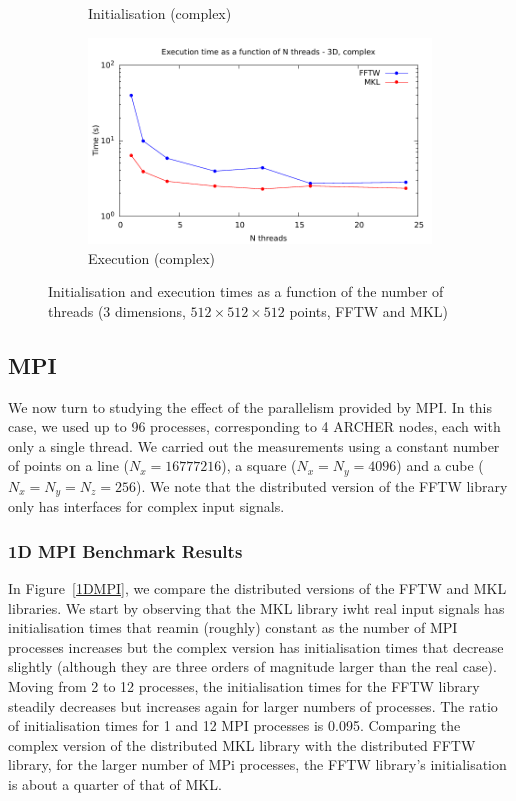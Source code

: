 \documentclass[12pt, a4paper]{article} \setlength{\textheight}{24cm}
\begin{document}
\begin{figure}[H]
\begin{subfigure}{.5\textwidth}
    \caption{Initialisation (complex)}
    \label{3DMULTHCI}
  \end{subfigure}%
  \begin{subfigure}{.5\textwidth}
    \centering
    \includegraphics[width=.9\linewidth]{graphs/3d-multh-exec-c.pdf}
    \caption{Execution (complex)}
    \label{3DMULTHCR}
  \end{subfigure}
  \caption{Initialisation and execution times as a function of the
    number of threads (3 dimensions, $512 \times 512\times 512$
    points, FFTW and MKL)}
  \label{3DMTHREAD}
\end{figure}

\subsection{MPI}\label{MPI}
We now turn to studying the effect of the parallelism provided by MPI.
In this case, we used up to 96 processes, corresponding to 4 ARCHER
nodes, each with only a single thread. We carried out the measurements
using a constant number of points on a line ($N_x=16777216$), a square
($N_x=N_y=4096$) and a cube ($N_x=N_y=N_z=256$). We note that the
distributed version of the FFTW library only has interfaces for
complex input signals.


\subsubsection{1D MPI Benchmark Results}
In Figure~\ref{1DMPI}, we compare the distributed versions of the FFTW
and MKL libraries. We start by observing that the MKL library iwht
real input signals has initialisation times that reamin (roughly)
constant as the number of MPI processes increases but the complex
version has initialisation times that decrease slightly (although they
are three orders of magnitude larger than the real case). Moving from
2 to 12 processes, the initialisation times for the FFTW library
steadily decreases but increases again for larger numbers of
processes. The ratio of initialisation times for 1 and 12 MPI
processes is 0.095. Comparing the complex version of the distributed
MKL library with the distributed FFTW library, for the larger number of MPi processes, the FFTW library's initialisation is about a quarter of that of MKL.
\end{document}
